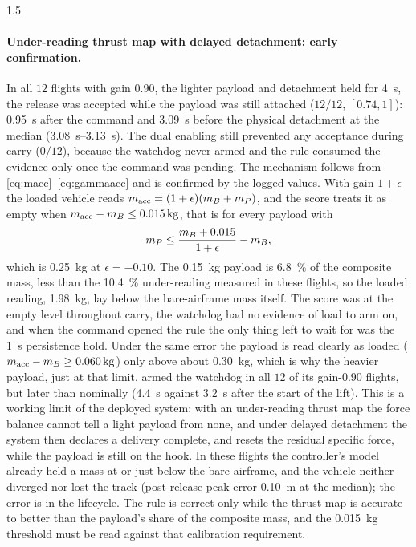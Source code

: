 \begin{spacing}{1.5}
\paragraph{Under-reading thrust map with delayed detachment: early
confirmation.} In all $12$ flights with gain $0.90$, the lighter payload and
detachment held for \SI{4}{\second}, the release was accepted while the payload
was still attached ($12/12$, $[0.74, 1]$): \SI{0.95}{\second} after the command
and \SI{3.09}{\second} before the physical detachment at the median
(\SIrange{3.08}{3.13}{\second}). The dual enabling still prevented any
acceptance during carry ($0/12$), because the watchdog never armed and the rule
consumed the evidence only once the command was pending. The mechanism follows
from \eqref{eq:macc}--\eqref{eq:gammaacc} and is confirmed by the logged values.
With gain $1+\epsilon$ the loaded vehicle reads
$m_{\mathrm{acc}}=(1+\epsilon)(m_B+m_P)$, and the score treats it as empty when
$m_{\mathrm{acc}}-\mB\le\SI{0.015}{\kg}$, that is for every payload with
\begin{equation}
m_P \le \frac{m_B+0.015}{1+\epsilon}-m_B ,
\label{eq:depempty}
\end{equation}
which is \SI{0.25}{\kg} at $\epsilon=-0.10$. The \SI{0.15}{\kg} payload is
\SI{6.8}{\percent} of the composite mass, less than the \SI{10.4}{\percent}
under-reading measured in these flights, so the loaded reading,
\SI{1.98}{\kg}, lay below the bare-airframe mass itself. The score was at the
empty level throughout carry, the watchdog had no evidence of load to arm on,
and when the command opened the rule the only thing left to wait for was the
\SI{1}{\second} persistence hold. Under the same error the payload is read
clearly as loaded ($m_{\mathrm{acc}}-\mB\ge\SI{0.060}{\kg}$) only above
about \SI{0.30}{\kg}, which is why the heavier payload, just at that limit, armed the watchdog in all $12$
of its gain-$0.90$ flights, but later than nominally (\SI{4.4}{\second} against
\SI{3.2}{\second} after the start of the lift). This is a working limit of the
deployed system: with an under-reading thrust map the force balance cannot tell
a light payload from none, and under delayed detachment the system then
declares a delivery complete, and resets the residual specific force, while the
payload is still on the hook. In these flights the controller's model already
held a mass at or just below the bare airframe, and the vehicle neither diverged nor lost the
track (post-release peak error \SI{0.10}{\meter} at the median); the error is in
the lifecycle. The rule is correct only while the thrust map is accurate to
better than the payload's share of the composite mass, and the
\SI{0.015}{\kg} threshold must be read against that calibration requirement.


\end{spacing}
